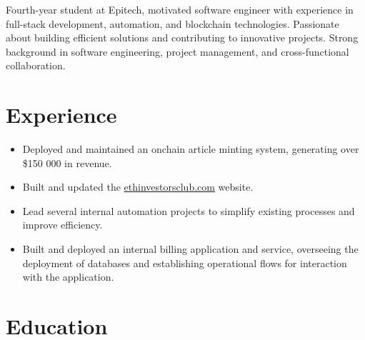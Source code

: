 \documentclass[11pt,a4paper,sans]{moderncv}
\begin{document}
\makecvtitle

Fourth-year student at Epitech, motivated software engineer with experience in full-stack development, automation, and blockchain technologies. 
Passionate about building efficient solutions and contributing to innovative projects. Strong background in software engineering, project management, and cross-functional collaboration.

\section{Experience}
{\begin{itemize}
    \item Deployed and maintained an onchain article minting system, generating over \$150 000 in revenue.
    \item Built and updated the \href{https://ethinvestorsclub.com}{ethinvestorsclub.com} website.
\end{itemize}}
{\begin{itemize}
    \item Lead several internal automation projects to simplify existing processes and improve efficiency.
\end{itemize}}
{\begin{itemize}
    \item Built and deployed an internal billing application and service, overseeing the deployment of databases and establishing operational flows for interaction with the application.
\end{itemize}}

\section{Education}
\end{document}

